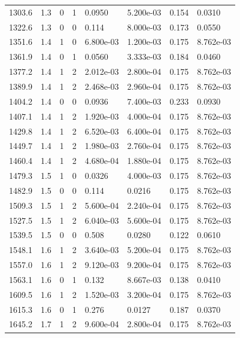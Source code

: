 \documentclass[preview]{standalone}
\begin{document}
{{{{\begin{tabular}{L{1.2cm}C{1.2cm} C{0.3cm}C{0.5cm} C{1.4cm}C{1.4cm} C{1.4cm}C{1.4cm}}
  1303.6  &   1.3  & 0     &  1 &  0.0950  & 5.200e-03  & 0.154 &  0.0310   \\ 
  1322.6  &   1.3  & 0     &  0 &  0.114  & 8.000e-03  & 0.173 &  0.0550   \\ 
  1351.6  &   1.4  & 1     &  0 &  6.800e-03  & 1.200e-03  & 0.175 &  8.762e-03   \\ 
  1361.9  &   1.4  & 0     &  1 &  0.0560  & 3.333e-03  & 0.184 &  0.0460   \\ 
  1377.2  &   1.4  & 1     &  2 &  2.012e-03  & 2.800e-04  & 0.175 &  8.762e-03   \\ 
  1389.9  &   1.4  & 1     &  2 &  2.468e-03  & 2.960e-04  & 0.175 &  8.762e-03   \\ 
  1404.2  &   1.4  & 0     &  0 &  0.0936  & 7.400e-03  & 0.233 &  0.0930   \\ 
  1407.1  &   1.4  & 1     &  2 &  1.920e-03  & 4.000e-04  & 0.175 &  8.762e-03   \\ 
  1429.8  &   1.4  & 1     &  2 &  6.520e-03  & 6.400e-04  & 0.175 &  8.762e-03   \\ 
  1449.7  &   1.4  & 1     &  2 &  1.980e-03  & 2.760e-04  & 0.175 &  8.762e-03   \\ 
  1460.4  &   1.4  & 1     &  2 &  4.680e-04  & 1.880e-04  & 0.175 &  8.762e-03   \\ 
  1479.3  &   1.5  & 1     &  0 &  0.0326  & 4.000e-03  & 0.175 &  8.762e-03   \\ 
  1482.9  &   1.5  & 0     &  0 &  0.114  & 0.0216  & 0.175 &  8.762e-03   \\ 
  1509.3  &   1.5  & 1     &  2 &  5.600e-04  & 2.240e-04  & 0.175 &  8.762e-03   \\ 
  1527.5  &   1.5  & 1     &  2 &  6.040e-03  & 5.600e-04  & 0.175 &  8.762e-03   \\ 
  1539.5  &   1.5  & 0     &  0 &  0.508  & 0.0280  & 0.122 &  0.0610   \\ 
  1548.1  &   1.6  & 1     &  2 &  3.640e-03  & 5.200e-04  & 0.175 &  8.762e-03   \\ 
  1557.0  &   1.6  & 1     &  2 &  9.120e-03  & 9.200e-04  & 0.175 &  8.762e-03   \\ 
  1563.1  &   1.6  & 0     &  1 &  0.132  & 8.667e-03  & 0.138 &  0.0410   \\ 
  1609.5  &   1.6  & 1     &  2 &  1.520e-03  & 3.200e-04  & 0.175 &  8.762e-03   \\ 
  1615.3  &   1.6  & 0     &  1 &  0.276  & 0.0127  & 0.187 &  0.0370   \\ 
  1645.2  &   1.7  & 1     &  2 &  9.600e-04  & 2.800e-04  & 0.175 &  8.762e-03   \\ 

\end{tabular}}}}}
\end{document}
